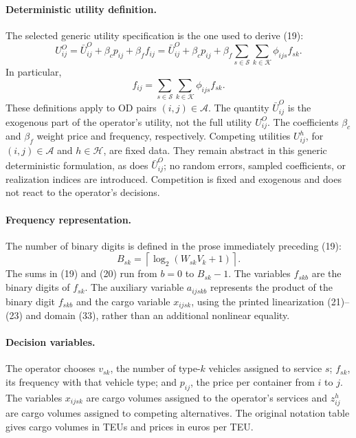 \documentclass{article}
\begin{document}
\paragraph{Deterministic utility definition.}
The selected generic utility specification is the one used to derive (19):
\begin{equation}
U_{ij}^{O}=\bar U_{ij}^{O}+\beta_c p_{ij}+\beta_f f_{ij}
=\bar U_{ij}^{O}+\beta_c p_{ij}
+\beta_f\sum_{s\in\mathcal S}\sum_{k\in\mathcal K}\phi_{ijs}f_{sk}.
\tag{17}
\end{equation}
In particular,
\[
f_{ij}=\sum_{s\in\mathcal S}\sum_{k\in\mathcal K}\phi_{ijs}f_{sk}.
\]
These definitions apply to OD pairs \((i,j)\in\mathcal A\). The quantity \(\bar U_{ij}^{O}\) is the exogenous part of the operator's utility, not the full utility \(U_{ij}^{O}\). The coefficients \(\beta_c\) and \(\beta_f\) weight price and frequency, respectively. Competing utilities \(U_{ij}^{h}\), for \((i,j)\in\mathcal A\) and \(h\in\mathcal H\), are fixed data. They remain abstract in this generic deterministic formulation, as does \(\bar U_{ij}^{O}\); no random errors, sampled coefficients, or realization indices are introduced. Competition is fixed and exogenous and does not react to the operator's decisions.

\paragraph{Frequency representation.}
The number of binary digits is defined in the prose immediately preceding (19):
\[
B_{sk}=\left\lceil\log_2(W_{sk}V_k+1)\right\rceil.
\]
The sums in (19) and (20) run from \(b=0\) to \(B_{sk}-1\). The variables \(f_{skb}\) are the binary digits of \(f_{sk}\). The auxiliary variable \(a_{ijskb}\) represents the product of the binary digit \(f_{skb}\) and the cargo variable \(x_{ijsk}\), using the printed linearization (21)--(23) and domain (33), rather than an additional nonlinear equality.

\paragraph{Decision variables.}
The operator chooses \(v_{sk}\), the number of type-\(k\) vehicles assigned to service \(s\); \(f_{sk}\), its frequency with that vehicle type; and \(p_{ij}\), the price per container from \(i\) to \(j\). The variables \(x_{ijsk}\) are cargo volumes assigned to the operator's services and \(z_{ij}^{h}\) are cargo volumes assigned to competing alternatives. The original notation table gives cargo volumes in TEUs and prices in euros per TEU.
\end{document}
